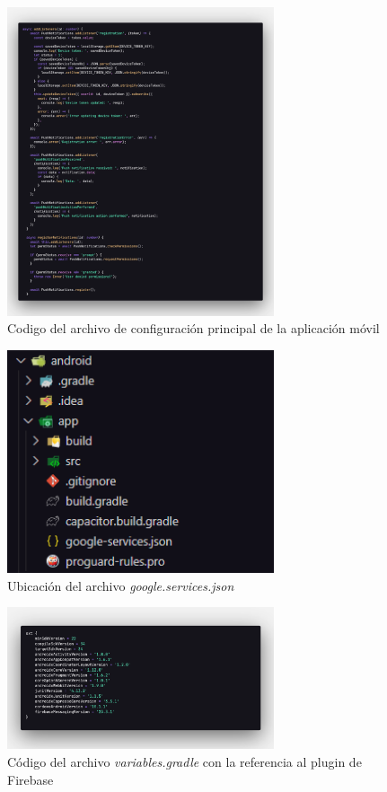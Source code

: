 \begin{figure}[H]
    \centering
    \includegraphics[width=0.7\textwidth]{resources/images/app-push}
    \caption{Codigo del archivo de configuración principal de la aplicación móvil}
    \label{fig:app-push}
\end{figure}

\begin{figure}[H]
    \centering
    \includegraphics[width=0.7\textwidth]{resources/images/app-firebase-config}
    \caption{Ubicación del archivo \textit{google.services.json}}
    \label{fig:app-firebase-config}
\end{figure}

\begin{figure}[H]
    \centering
    \includegraphics[width=0.7\textwidth]{resources/images/app-gradle}
    \caption{Código del archivo \textit{variables.gradle} con la referencia al plugin de Firebase}
    \label{fig:app-gradle}
\end{figure}

